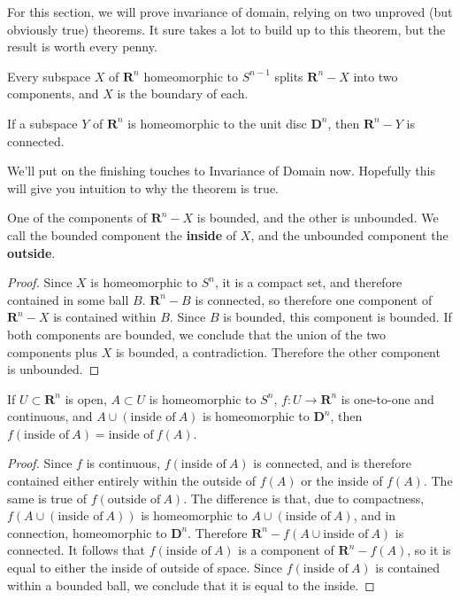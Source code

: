 For this section, we will prove invariance of domain, relying on two unproved (but obviously true) theorems. It sure takes a lot to build up to this theorem, but the result is worth every penny.

\begin{theorem}
    Every subspace $X$ of $\mathbf{R}^n$ homeomorphic to $S^{n-1}$ splits $\mathbf{R}^n - X$ into two components, and $X$ is the boundary of each.
\end{theorem}

\begin{theorem}
    If a subspace $Y$ of $\mathbf{R}^n$ is homeomorphic to the unit disc $\mathbf{D}^n$, then $\mathbf{R}^n - Y$ is connected.
\end{theorem}

We'll put on the finishing touches to Invariance of Domain now. Hopefully this will give you intuition to why the theorem is true.

\begin{lemma}
    One of the components of $\mathbf{R}^n - X$ is bounded, and the other is unbounded. We call the bounded component the {\bf inside} of $X$, and the unbounded component the {\bf outside}.
\end{lemma}
\begin{proof}
    Since $X$ is homeomorphic to $S^n$, it is a compact set, and therefore contained in some ball $B$. $\mathbf{R}^n - B$ is connected, so therefore one component of $\mathbf{R}^n - X$ is contained within $B$. Since $B$ is bounded, this component is bounded. If both components are bounded, we conclude that the union of the two components plus $X$ is bounded, a contradiction. Therefore the other component is unbounded.
\end{proof}

\begin{lemma}
    If $U \subset \mathbf{R}^n$ is open, $A \subset U$ is homeomorphic to $S^n$, $f:U \to \mathbf{R}^n$ is one-to-one and continuous, and $A \cup (\text{inside of}\ A)$ is homeomorphic to $\mathbf{D}^n$, then $f(\text{inside of}\ A) = \text{inside of}\ f(A)$.
\end{lemma}
\begin{proof}
    Since $f$ is continuous, $f(\text{inside of}\ A)$ is connected, and is therefore contained either entirely within the outside of $f(A)$ or the inside of $f(A)$. The same is true of $f(\text{outside of}\ A)$. The difference is that, due to compactness, $f(A \cup (\text{inside of}\ A))$ is homeomorphic to $A \cup (\text{inside of}\ A)$, and in connection, homeomorphic to $\mathbf{D}^n$. Therefore $\mathbf{R}^n - f(A \cup \text{inside of}\ A)$ is connected. It follows that $f(\text{inside of}\ A)$ is a component of $\mathbf{R}^n - f(A)$, so it is equal to either the inside of outside of space. Since $f(\text{inside of}\ A)$ is contained within a bounded ball, we conclude that it is equal to the inside.
\end{proof}

